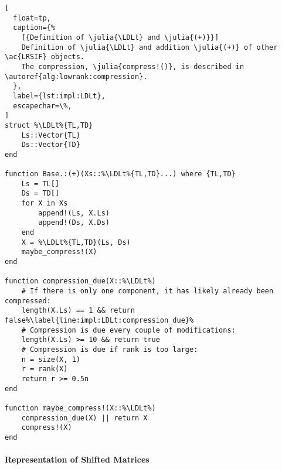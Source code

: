 \begin{lstlisting}[
  float=tp,
  caption={%
    [{Definition of \julia{\LDLt} and \julia{(+)}}]
    Definition of \julia{\LDLt} and addition \julia{(+)} of other \ac{LRSIF} objects.
    The compression, \julia{compress!()}, is described in \autoref{alg:lowrank:compression}.
  },
  label={lst:impl:LDLt},
  escapechar=\%,
]
struct %\LDLt%{TL,TD}
    Ls::Vector{TL}
    Ds::Vector{TD}
end

function Base.:(+)(Xs::%\LDLt%{TL,TD}...) where {TL,TD}
    Ls = TL[]
    Ds = TD[]
    for X in Xs
        append!(Ls, X.Ls)
        append!(Ds, X.Ds)
    end
    X = %\LDLt%{TL,TD}(Ls, Ds)
    maybe_compress!(X)
end

function compression_due(X::%\LDLt%)
    # If there is only one component, it has likely already been compressed:
    length(X.Ls) == 1 && return false%\label{line:impl:LDLt:compression_due}%
    # Compression is due every couple of modifications:
    length(X.Ls) >= 10 && return true
    # Compression is due if rank is too large:
    n = size(X, 1)
    r = rank(X)
    return r >= 0.5n
end

function maybe_compress!(X::%\LDLt%)
    compression_due(X) || return X
    compress!(X)
end
\end{lstlisting}

\paragraph{Representation of Shifted Matrices}

